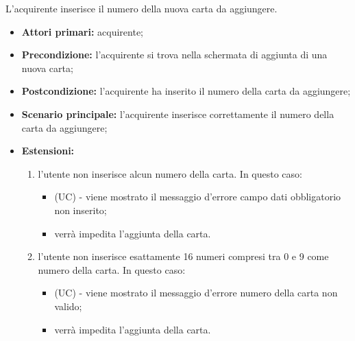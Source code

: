 L'acquirente inserisce il numero della nuova carta da aggiungere.
\begin{itemize}
    \item \textbf{Attori primari:} acquirente;
    \item \textbf{Precondizione:} l'acquirente si trova nella schermata di aggiunta di una nuova carta;
    \item \textbf{Postcondizione:} l'acquirente ha inserito il numero della carta da aggiungere;
    \item \textbf{Scenario principale:} l'acquirente inserisce correttamente il numero della carta da aggiungere;
    \item \textbf{Estensioni:}
    \begin{enumerate}[label=\lett]
        \item l'utente non inserisce alcun numero della carta. In questo caso:
        \begin{itemize}
            \item (UC) - viene mostrato il messaggio d'errore campo dati obbligatorio non inserito;
            \item verrà impedita l'aggiunta della carta.
        \end{itemize}
        \item l'utente non inserisce esattamente 16 numeri compresi tra 0 e 9 come numero della carta. In questo caso:
        \begin{itemize}
            \item (UC) - viene mostrato il messaggio d'errore numero della carta non valido;
            \item verrà impedita l'aggiunta della carta.
        \end{itemize}
    \end{enumerate}
\end{itemize}


